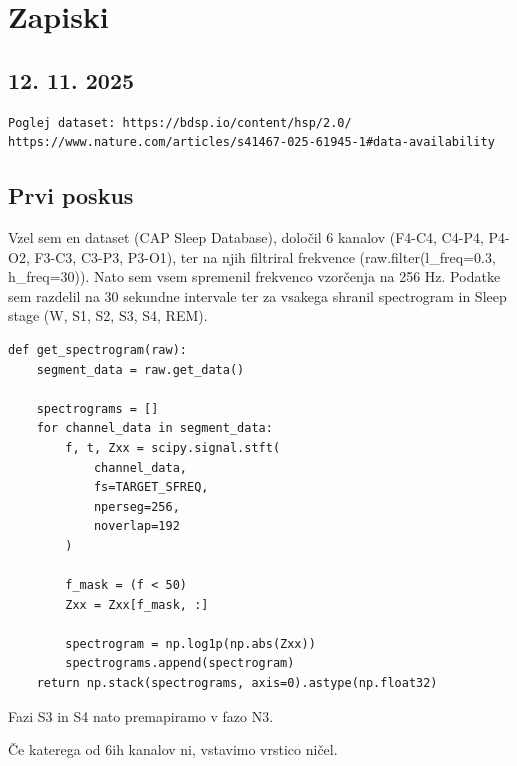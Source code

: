 \chapter{Zapiski}

\section{12. 11. 2025}
\begin{verbatim}
Poglej dataset: https://bdsp.io/content/hsp/2.0/
https://www.nature.com/articles/s41467-025-61945-1#data-availability
\end{verbatim}


\section{Prvi poskus}
Vzel sem en dataset (CAP Sleep Database), določil 6 kanalov (F4-C4, C4-P4, P4-O2, F3-C3, C3-P3, P3-O1), ter
na njih filtriral frekvence (raw.filter(l\_freq=0.3, h\_freq=30)). Nato sem vsem spremenil frekvenco vzorčenja na
256 Hz. Podatke sem razdelil na 30 sekundne intervale ter za vsakega shranil spectrogram in Sleep stage (W, S1, S2, S3, S4, REM).
\begin{verbatim}
def get_spectrogram(raw):
    segment_data = raw.get_data()

    spectrograms = []
    for channel_data in segment_data:
        f, t, Zxx = scipy.signal.stft(
            channel_data,
            fs=TARGET_SFREQ,
            nperseg=256,
            noverlap=192
        )
        
        f_mask = (f < 50)
        Zxx = Zxx[f_mask, :]

        spectrogram = np.log1p(np.abs(Zxx))
        spectrograms.append(spectrogram)
    return np.stack(spectrograms, axis=0).astype(np.float32)
\end{verbatim}

Fazi S3 in S4 nato premapiramo v fazo N3.

Če katerega od 6ih kanalov ni, vstavimo vrstico ničel.

